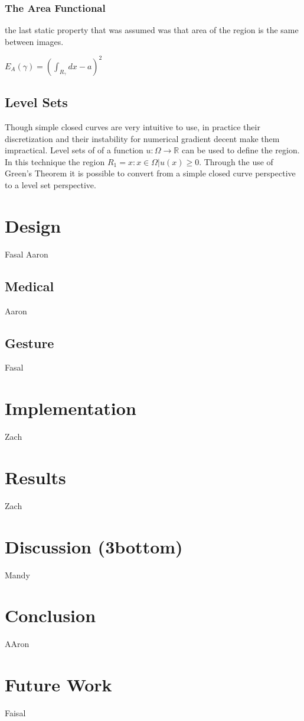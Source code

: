 \documentclass{article}
\newcommand{\R}{\mathds{R}}
\begin{document}
			\subsubsection{The Area Functional}
				the last static property that was assumed was that area of the region is the same between images.
				\begin{center}
					$E_{A}(\gamma) = (\int_{R_\gamma}{dx} - a)^2$
				\end{center}

		\subsection{Level Sets}
			Though simple closed curves are  very intuitive to use, in practice their discretization and their instability for numerical gradient decent make them impractical. Level sets of of a function $u:\Omega\rightarrow\R$ can be used to define the region. In this technique the region $R_1 = {x: x\in\Omega|u(x)\geq0}$. Through the use of Green's Theorem it is possible to convert from a simple closed curve perspective to a level set perspective.

			


	\section{Design}
		Fasal Aaron

		\subsection{Medical}
			Aaron

		\subsection{Gesture}
			Fasal

	\section{Implementation}
		Zach

	\section{Results}
		Zach

	\section{Discussion (3bottom)}
		Mandy

	\section{Conclusion}
		AAron

	\section{Future Work}
		Faisal

	
	
	
\end{document}
